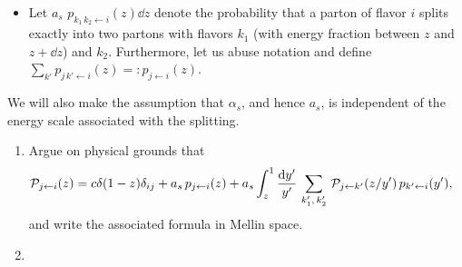 \begin{problems}
{\begin{itemize}
        \item
            Let \(a_s\,\,p_{k_1\,k_2 \leftarrow i}(z) \dd z\) denote the probability that a parton of flavor \(i\) splits exactly into two partons with flavors \(k_1\) (with energy fraction between \(z\) and \(z + \dd z\)) and \(k_2\).
            Furthermore, let us abuse notation and define \(\sum_{k'} p_{j\,k' \leftarrow i}(z) =: p_{j\leftarrow i}(z)\).
    \end{itemize}

    We will also make the assumption that \(\alpha_s\), and hence \(a_s\), is independent of the energy scale associated with the splitting.


    \begin{enumerate}[label=\roman*)]
        \item
            Argue on physical grounds that
            \begin{align}
                \label{eq:feynman_field_fragmentation_formula}
                \mc P_{j\leftarrow i}(z)
                &=
                c \delta(1-z) \delta_{ij}
                +
                a_s \, p_{j \leftarrow i}(z)
                +
                a_s \int_z^1 \frac{\dd y'}{y'} \, \sum_{k_1',\,k_2'} \,
                    \mc P_{j\leftarrow k'}(z/y')
                    \,
                    p_{k' \leftarrow i}(y')
                ,
            \end{align}
            and write the associated formula in Mellin space.


        \item
    \end{enumerate}
}





\end{problems}
